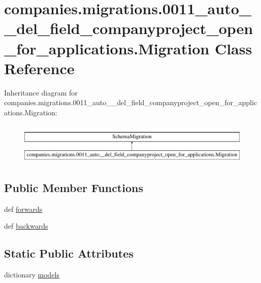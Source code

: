 \hypertarget{classcompanies_1_1migrations_1_10011__auto____del__field__companyproject__open__for__applications_1_1_migration}{\section{companies.\-migrations.0011\-\_\-auto\-\_\-\-\_\-del\-\_\-field\-\_\-companyproject\-\_\-open\-\_\-for\-\_\-applications.Migration Class Reference}
\label{classcompanies_1_1migrations_1_10011__auto____del__field__companyproject__open__for__applications_1_1_migration}
}
Inheritance diagram for companies.\-migrations.0011\-\_\-auto\-\_\-\-\_\-del\-\_\-field\-\_\-companyproject\-\_\-open\-\_\-for\-\_\-applications.Migration\-:\begin{figure}[H]
\begin{center}
\leavevmode
\includegraphics[height=2.000000cm]{classcompanies_1_1migrations_1_10011__auto____del__field__companyproject__open__for__applications_1_1_migration}
\end{center}
\end{figure}
\subsection*{Public Member Functions}
\begin{DoxyCompactItemize}
\item 
def \hyperlink{classcompanies_1_1migrations_1_10011__auto____del__field__companyproject__open__for__applications_1_1_migration_a0a147390d8459d9e951911cd05455830}{forwards}
\item 
def \hyperlink{classcompanies_1_1migrations_1_10011__auto____del__field__companyproject__open__for__applications_1_1_migration_a266562d4ccb813eafeb7004bd2d3604d}{backwards}
\end{DoxyCompactItemize}
\subsection*{Static Public Attributes}
\begin{DoxyCompactItemize}
\item 
dictionary \hyperlink{classcompanies_1_1migrations_1_10011__auto____del__field__companyproject__open__for__applications_1_1_migration_addfc790b7ce391c2ba297301e370d698}{models}
\end{DoxyCompactItemize}


